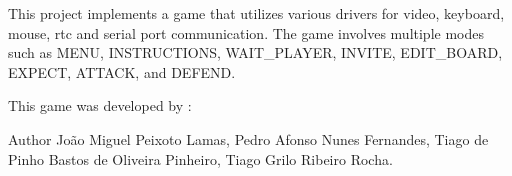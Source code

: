 This project implements a game that utilizes various drivers for video, keyboard, mouse, rtc and serial port communication. The game involves multiple modes such as MENU, INSTRUCTIONS, WAIT\+\_\+\+PLAYER, INVITE, EDIT\+\_\+\+BOARD, EXPECT, ATTACK, and DEFEND.

This game was developed by \+: \begin{DoxyAuthor}{Author}
João Miguel Peixoto Lamas, Pedro Afonso Nunes Fernandes, Tiago de Pinho Bastos de Oliveira Pinheiro, Tiago Grilo Ribeiro Rocha. 
\end{DoxyAuthor}
